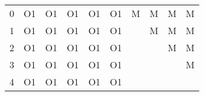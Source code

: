 \begin{longtable}{llllllllll}
\toprule
0 &  O1 &  O1 &  O1 &  O1 &  O1 &  M &  M &  M &  M \\
1 &  O1 &  O1 &  O1 &  O1 &  O1 &    &  M &  M &  M \\
2 &  O1 &  O1 &  O1 &  O1 &  O1 &    &    &  M &  M \\
3 &  O1 &  O1 &  O1 &  O1 &  O1 &    &    &    &  M \\
4 &  O1 &  O1 &  O1 &  O1 &  O1 &    &    &    &    \\
\end{longtable}
